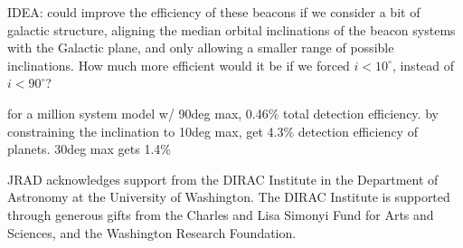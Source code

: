 \documentclass[modern]{aastex62}
\begin{document}
IDEA:
could improve the efficiency of these beacons if we consider a bit of galactic structure, aligning the median orbital inclinations of the beacon systems with the Galactic plane, and only allowing a smaller range of possible inclinations. How much more efficient would it be if we forced $i<10^\circ$, instead of $i<90^\circ$?

for a million system model w/ 90deg max, 0.46\% total detection efficiency. 
by constraining the inclination to 10deg max, get 4.3\% detection efficiency of planets. 30deg max gets 1.4\%




\acknowledgments
%

JRAD acknowledges support from the DIRAC Institute in the Department of Astronomy at the University of Washington. The DIRAC Institute is supported through generous gifts from the Charles and Lisa Simonyi Fund for Arts and Sciences, and the Washington Research Foundation.


\end{document}

